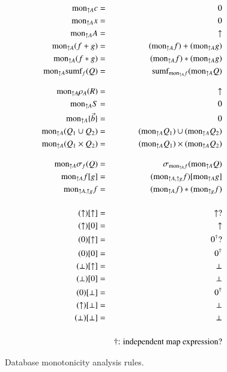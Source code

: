 \documentclass{article}
\begin{document}
\begin{figure}
\begin{eqnarray*}
\algmon_{\uparrow A} c &=& 0
\\
\algmon_{\uparrow A} x &=& 0
\\
\algmon_{\uparrow A} A &=& \uparrow
\\
\algmon_{\uparrow A} (f + g) &=&
(\algmon_{\uparrow A} f) + (\algmon_{\uparrow A} g)
\\
\algmon_{\uparrow A} (f * g) &=&
(\algmon_{\uparrow A} f) * (\algmon_{\uparrow A} g)
\\
\algmon_{\uparrow A} \algsumf_{f}(Q) &=&
\algsumf_{\algmon_{\uparrow A} f}(\algmon_{\uparrow A} Q)
%
%
%
\\[2ex]
\algmon_{\uparrow A} \rho_{A}(R) &=& \uparrow
\\
\algmon_{\uparrow A} S &=& 0
\\
\algmon_{\uparrow A} \{ \vec{b} \} &=& 0
\\
\algmon_{\uparrow A} (Q_1 \cup Q_2) &=&
(\algmon_{\uparrow A} Q_1) \cup (\algmon_{\uparrow A} Q_2)
\\
\algmon_{\uparrow A} (Q_1 \times Q_2) &=&
(\algmon_{\uparrow A} Q_1) \times (\algmon_{\uparrow A} Q_2)
%
%
\\[2ex]
\algmon_{\uparrow A} \sigma_{f} (Q) &=&
\sigma_{\algmon_{\uparrow A} f} (\algmon_{\uparrow A} Q)
\\
\algmon_{\uparrow A} f[g] &=&
(\algmon_{\uparrow A, \uparrow g} f)[\algmon_{\uparrow A} g]
\\
\algmon_{\uparrow A, \uparrow g} f &=& 
(\algmon_{\uparrow A} f) * (\algmon_{\uparrow g} f)
%
%
%
\\[3ex]
(\uparrow)[\uparrow] &=& \uparrow ?
\\
(\uparrow)[0] &=& \uparrow
\\
(0)[\uparrow] &=& 0^{\dagger} ?
\\
(0)[0] &=& 0^{\dagger}
\\
(\perp)[\uparrow] &=& \perp
\\
(\perp)[0] &=& \perp
\\
(0)[\perp] &=& 0^{\dagger}
\\
(\uparrow)[\perp] &=& \perp
\\
(\perp)[\perp] &=& \perp
%
%
\\[3ex]
& & \mbox{$\dagger$: independent map expression?}
\end{eqnarray*}
\caption{Database monotonicity analysis rules.}
\end{figure}

\pagebreak
\end{document}
